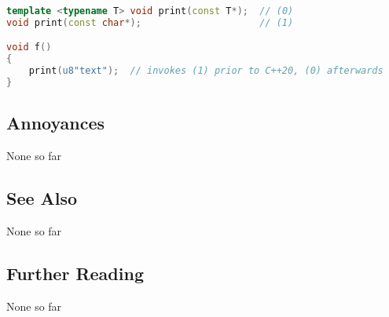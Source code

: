 \begin{lstlisting}[language=C++, basicstyle={\ttfamily\footnotesize}]
template <typename T> void print(const T*);  // (0)
void print(const char*);                     // (1)

void f()
{
    print(u8"text");  // invokes (1) prior to C++20, (0) afterwards
}
\end{lstlisting}


\subsection[Annoyances]{Annoyances}\label{annoyances}

None so far

\subsection[See Also]{See Also}\label{see-also}

None so far

\subsection[Further Reading]{Further Reading}\label{further-reading}

None so far

